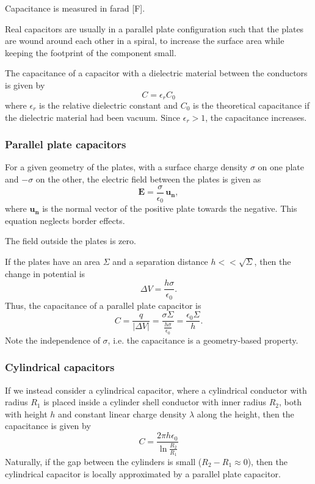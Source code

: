 \documentclass[a4paper, 12pt]{article}
\renewcommand{\vec}[1]{\mathbf{#1}}
\newcommand{\E}{\ensuremath{\vec{E}}}
\newcommand{\e}{\ensuremath{\epsilon_0}}
\begin{document}
    Capacitance is measured in farad [F].
    
    Real capacitors are usually in a parallel plate configuration such that the plates are wound around each other in a spiral, to increase the surface area while keeping the footprint of the component small.
    
    The capacitance of a capacitor with a dielectric material between the conductors is given by
    \begin{equation}
        C = \epsilon_rC_0
    \end{equation}
    where $\epsilon_r$ is the relative dielectric constant and $C_0$ is the theoretical capacitance if the dielectric material had been vacuum. Since $\epsilon_r > 1$, the capacitance increases.
    
    \subsubsection{Parallel plate capacitors}
        For a given geometry of the plates, with a surface charge density $\sigma$ on one plate and $-\sigma$ on the other, the electric field between the plates is given as 
        \begin{equation}
            \E = \frac{\sigma}{\e}\,\vec{u_n},
        \end{equation}
        where $\vec{u_n}$ is the normal vector of the positive plate towards the negative. This equation neglects border effects.
        
        The field outside the plates is zero.
        
        If the plates have an area $\Sigma$ and a separation distance $h << \sqrt{\Sigma}$, then the change in potential is
        \begin{equation}
            \Delta V = \frac{h\sigma}{\e}.
        \end{equation}
        Thus, the capacitance of a parallel plate capacitor is
        \begin{equation}
            C = \frac{q}{|\Delta V|} = \frac{\sigma \Sigma}{\frac{h\sigma}{\e}} = \frac{\e \Sigma}{h}.
        \end{equation}
        Note the independence of $\sigma$, i.e. the capacitance is a geometry-based property.
    \subsubsection{Cylindrical capacitors}
        If we instead consider a cylindrical capacitor, where a cylindrical conductor with radius $R_1$ is placed inside a cylinder shell conductor with inner radius $R_2$, both with height $h$ and constant linear charge density $\lambda$ along the height, then the capacitance is given by 
        \begin{equation}
            C = \frac{2\pi h \e}{\ln{\frac{R_2}{R_1}}}
        \end{equation}
        Naturally, if the gap between the cylinders is small ($R_2 - R_1 \approx 0$), then the cylindrical capacitor is locally approximated by a parallel plate capacitor.
\end{document}

